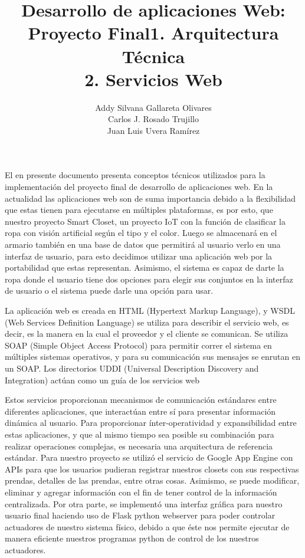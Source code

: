 \documentclass[a4paper,10pt]{article}
\title{Desarrollo de aplicaciones Web: Proyecto Final}
\author{Addy Silvana Gallareta Olivares \\ Carlos J. Rosado Trujillo \\ Juan Luis Uvera Ramírez}
\begin{document}
\maketitle
El en presente documento presenta conceptos técnicos utilizados para la implementación del proyecto final de desarrollo de aplicaciones web. 
    En la actualidad las aplicaciones web son de suma importancia debido a la flexibilidad que estas tienen para ejecutarse en múltiples plataformas, es por esto, que nuestro proyecto Smart Closet, un proyecto IoT con la función de clasificar la ropa con visión artificial según el tipo y el color. Luego se almacenará en el armario también en una base de datos que permitirá al usuario verlo en una interfaz de usuario, para esto decidimos utilizar una aplicación web por la portabilidad que estas representan. Asimismo, el sistema es capaz de darte la ropa donde el usuario tiene dos opciones para elegir sus conjuntos en la interfaz de usuario o el sistema puede darle una opción para usar.\\
\medskip

\maketitle
\title{\textbf{\large{1. Arquitectura Técnica}}\\}
La aplicación web es creada en HTML (Hypertext Markup Language), y WSDL (Web Services Definition Language) se utiliza para describir el servicio web, es decir, es la manera en la cual el proveedor y el cliente se comunican. Se utiliza SOAP (Simple Object Access Protocol) para permitir correr el sistema en múltiples sistemas operativos, y para su comunicación sus mensajes se enrutan en un SOAP. Los directorios UDDI (Universal Description Discovery and Integration) actúan como un guía de los servicios web\\
\medskip

\maketitle
\title{\textbf{\large{2. Servicios Web}}\\}
Estos servicios proporcionan mecanismos de comunicación estándares entre diferentes aplicaciones, que interactúan entre sí para presentar información dinámica al usuario. Para proporcionar ínter-operatividad y expansibilidad entre estas aplicaciones, y que al mismo tiempo sea posible su combinación para realizar operaciones complejas, es necesaria una arquitectura de referencia estándar.
Para nuestro proyecto se utilizó el servicio de Google App Engine con APIs para que los usuarios pudieran registrar nuestros closets con sus respectivas prendas, detalles de las prendas, entre otras cosas. Asimismo, se puede modificar, eliminar y agregar información con el fin de tener control de la información centralizada.
Por otra parte, se implementó una interfaz gráfica para nuestro usuario final haciendo uso de Flask python webserver para poder controlar actuadores de nuestro sistema físico, debido a que éste nos permite ejecutar de manera eficiente nuestros programas python de control de los nuestros actuadores.\\
\medskip
\end{document}
